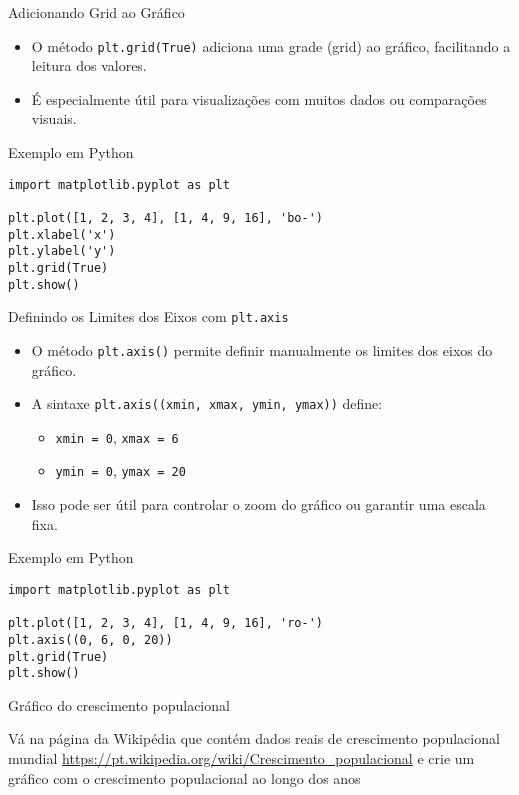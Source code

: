 \begin{frame}[fragile]{Adicionando Grid ao Gráfico}
    \begin{itemize}
        \item O método \texttt{plt.grid(True)} adiciona uma grade (grid) ao gráfico, facilitando a leitura dos valores.
        \item É especialmente útil para visualizações com muitos dados ou comparações visuais.
    \end{itemize}

    \begin{block}{Exemplo em Python}
        \begin{verbatim}
import matplotlib.pyplot as plt

plt.plot([1, 2, 3, 4], [1, 4, 9, 16], 'bo-')
plt.xlabel('x')
plt.ylabel('y')
plt.grid(True)
plt.show()
\end{verbatim}
    \end{block}
\end{frame}

\begin{frame}[fragile]{Definindo os Limites dos Eixos com \texttt{plt.axis}}
    \begin{itemize}
        \item O método \texttt{plt.axis()} permite definir manualmente os limites dos eixos do gráfico.
        \item A sintaxe \texttt{plt.axis((xmin, xmax, ymin, ymax))} define:
              \begin{itemize}
                  \item \texttt{xmin = 0}, \texttt{xmax = 6}
                  \item \texttt{ymin = 0}, \texttt{ymax = 20}
              \end{itemize}
        \item Isso pode ser útil para controlar o zoom do gráfico ou garantir uma escala fixa.
    \end{itemize}

    \begin{block}{Exemplo em Python}
        \begin{verbatim}
import matplotlib.pyplot as plt

plt.plot([1, 2, 3, 4], [1, 4, 9, 16], 'ro-')
plt.axis((0, 6, 0, 20))
plt.grid(True)
plt.show()
\end{verbatim}
    \end{block}
\end{frame}

\begin{frame}{Gráfico do crescimento populacional}

    Vá na página da Wikipédia que contém dados reais de crescimento populacional mundial  \url{https://pt.wikipedia.org/wiki/Crescimento_populacional} e crie um gráfico com o crescimento populacional ao longo dos anos


\end{frame}


